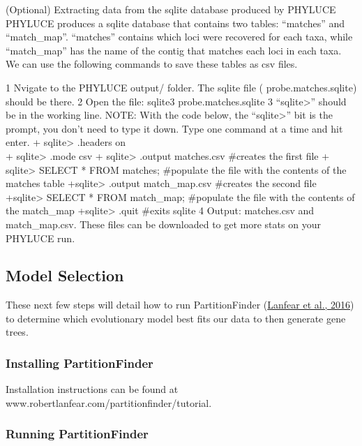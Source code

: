 \documentclass[
  12pt,
]{article}
\begin{document}
(Optional) Extracting data from the sqlite database produced by PHYLUCE
PHYLUCE produces a sqlite database that contains two tables: ``matches'' and ``match\_map''. ``matches'' contains which loci were recovered for each taxa, while ``match\_map'' has the name of the contig that matches each loci in each taxa. We can use the following commands to save these tables as csv files.

1 Nvigate to the PHYLUCE output/ folder. The sqlite file ( probe.matches.sqlite) should be there.
2 Open the file:
sqlite3 probe.matches.sqlite
3 ``sqlite\textgreater{}'' should be in the working line.
NOTE: With the code below, the ``sqlite\textgreater{}'' bit is the prompt, you don't need to type it down. Type one command at a time and hit enter.
+ sqlite\textgreater{} .headers on\\
+ sqlite\textgreater{} .mode csv
+ sqlite\textgreater{} .output matches.csv \#creates the first file
+ sqlite\textgreater{} SELECT * FROM matches; \#populate the file with the contents of the matches table
+sqlite\textgreater{} .output match\_map.csv \#creates the second file
+sqlite\textgreater{} SELECT * FROM match\_map; \#populate the file with the contents of the match\_map
+sqlite\textgreater{} .quit \#exits sqlite
4 Output: matches.csv and match\_map.csv. These files can be downloaded to get more stats on your PHYLUCE run.

\hypertarget{model-selection}{%
\subsection{Model Selection}\label{model-selection}}

These next few steps will detail how to run PartitionFinder (\protect\hyperlink{ref-Lanfear2016}{Lanfear et al., 2016}) to determine which evolutionary model best fits our data to then generate gene trees.

\hypertarget{installing-partitionfinder}{%
\subsubsection{Installing PartitionFinder}\label{installing-partitionfinder}}

Installation instructions can be found at www.robertlanfear.com/partitionfinder/tutorial.

\hypertarget{running-partitionfinder}{%
\subsubsection{Running PartitionFinder}\label{running-partitionfinder}}
\end{document}
